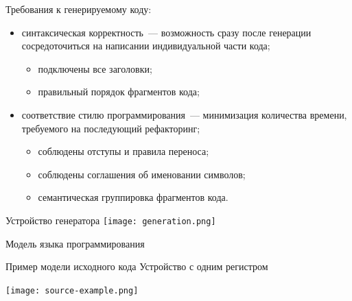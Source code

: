 \documentclass[unicode,hyperref={unicode=true}]{beamer}
\theoremstyle{definition}
\theoremstyle{plain}
\begin{document}
\begin{frame}{Требования к генерируемому коду:}
\begin{itemize}
\item синтаксическая корректность~--- возможность сразу после генерации
сосредоточиться на написании индивидуальной части кода;
\begin{itemize}
\item подключены все заголовки;
\item правильный порядок фрагментов кода;
\end{itemize}
\item соответствие стилю программирования~--- минимизация количества времени,
требуемого на последующий рефакторинг;
\begin{itemize}
\item соблюдены отступы и правила переноса;
\item соблюдены соглашения об именовании символов;
\item семантическая группировка фрагментов кода.
\end{itemize}
\end{itemize}
\end{frame}



\begin{frame}{Устройство генератора}
\texttt{[image: generation.png]}
\end{frame}



\begin{frame}{Модель языка программирования}
\end{frame}



\begin{frame}{Пример модели исходного кода}
Устройство с одним регистром\\
\vfill
\begin{center}
\texttt{[image: source-example.png]}
\end{center}
\end{frame}
\end{document}
